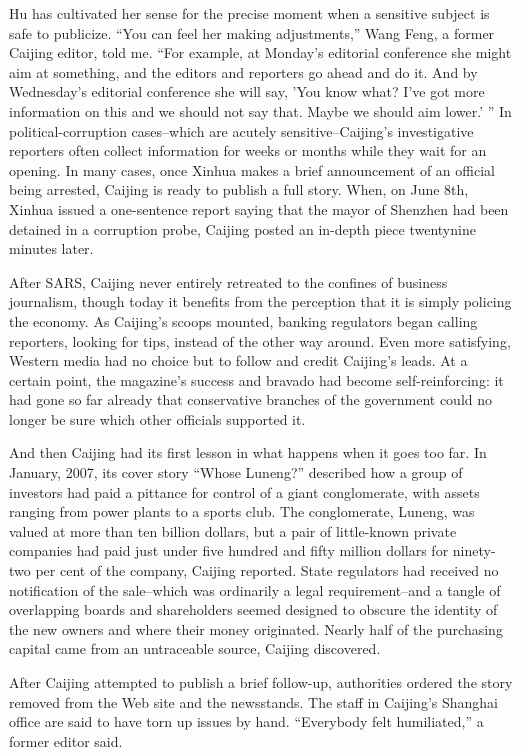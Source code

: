 ﻿\documentclass[12pt]{article}
\begin{document}
Hu has cultivated her sense for the precise moment when a sensitive subject is safe to publicize.
``You can feel her making adjustments,'' Wang Feng, a former Caijing editor, told me. ``For example,
at Monday's editorial conference she might aim at something, and the editors and reporters go ahead
and do it. And by Wednesday's editorial conference she will say, 'You know what? I've got more
information on this and we should not say that. Maybe we should aim lower.' '' In
political-corruption cases--which are acutely sensitive--Caijing's investigative reporters often
collect information for weeks or months while they wait for an opening. In many cases, once Xinhua
makes a brief announcement of an official being arrested, Caijing is ready to publish a full story.
When, on June 8th, Xinhua issued a one-sentence report saying that the mayor of Shenzhen had been
detained in a corruption probe, Caijing posted an in-depth piece twentynine minutes later.

After SARS, Caijing never entirely retreated to the confines of business journalism, though today it
benefits from the perception that it is simply policing the economy. As Caijing's scoops mounted,
banking regulators began calling reporters, looking for tips, instead of the other way around. Even
more satisfying, Western media had no choice but to follow and credit Caijing's leads. At a certain
point, the magazine's success and bravado had become self-reinforcing: it had gone so far already
that conservative branches of the government could no longer be sure which other officials supported
it.

And then Caijing had its first lesson in what happens when it goes too far. In January, 2007, its
cover story ``Whose Luneng?'' described how a group of investors had paid a pittance for control of
a giant conglomerate, with assets ranging from power plants to a sports club. The conglomerate,
Luneng, was valued at more than ten billion dollars, but a pair of little-known private companies
had paid just under five hundred and fifty million dollars for ninety-two per cent of the company,
Caijing reported. State regulators had received no notification of the sale--which was ordinarily a
legal requirement--and a tangle of overlapping boards and shareholders seemed designed to obscure
the identity of the new owners and where their money originated. Nearly half of the purchasing
capital came from an untraceable source, Caijing discovered.

After Caijing attempted to publish a brief follow-up, authorities ordered the story removed from the
Web site and the newsstands. The staff in Caijing's Shanghai office are said to have torn up issues
by hand. ``Everybody felt humiliated,'' a former editor said.
\end{document}

